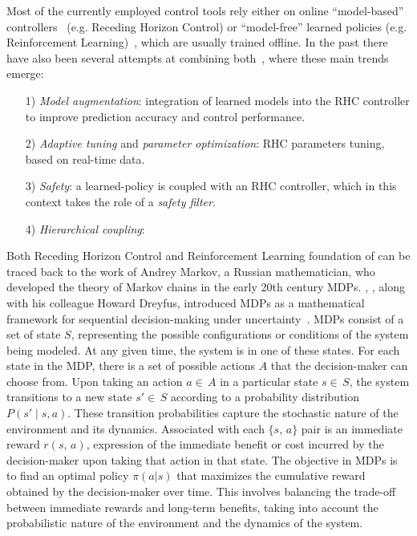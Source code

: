 Most of the currently employed control tools rely either on online ``model-based'' controllers~\cite{modern_mpc:neunert2018whole,web::atlas_grip_boston_dyn} (e.g. Receding Horizon Control) or ``model-free'' learned policies (e.g. Reinforcement Learning)~\cite{rl:schneider2023learning,rl:miki2024learning}, which are usually trained offline. In the past there have also been several attempts at combining both~\cite{}, where these main trends emerge:
\begin{itemize}
\item[1)] \textit{Model augmentation}: integration of learned models into the RHC controller to improve prediction accuracy and control performance.
\item[2)] \textit{Adaptive tuning} and \textit{parameter optimization}: RHC parameters tuning, based on real-time data.
\item[3)] \textit{Safety}: a learned-policy is coupled with an RHC controller, which in this context takes the role of a \textit{safety filter}.
\item[4)] \textit{Hierarchical coupling}:
\end{itemize}
Both Receding Horizon Control and Reinforcement Learning 
foundation of  can be traced back to the work of Andrey Markov, a Russian mathematician, who developed the theory of Markov chains in the early 20th century
MDPs. , , along with his colleague Howard Dreyfus, introduced MDPs as a mathematical framework for sequential decision-making under uncertainty~\cite{rl:bellman1957markovian}.
MDPs consist of a set of state $S$, representing the possible configurations or conditions of the system being modeled. At any given time, the system is in one of these states. For each state in the MDP, there is a set of possible actions $A$ that the decision-maker can choose from. Upon taking an action $a\in\,A$ in a particular state $s\in\,S$, the system transitions to a new state $s'\in\,S$ according to a probability distribution $P(s' \mid s, a)$. These transition probabilities capture the stochastic nature of the environment and its dynamics. Associated with each $\{s,\,a\}$ pair is an immediate reward $r(s,\,a)$, expression of the immediate benefit or cost incurred by the decision-maker upon taking that action in that state. The objective in MDPs is to find an optimal policy $\pi(a \vert s)$ that maximizes the cumulative reward obtained by the decision-maker over time. This involves balancing the trade-off between immediate rewards and long-term benefits, taking into account the probabilistic nature of the environment and the dynamics of the system.
